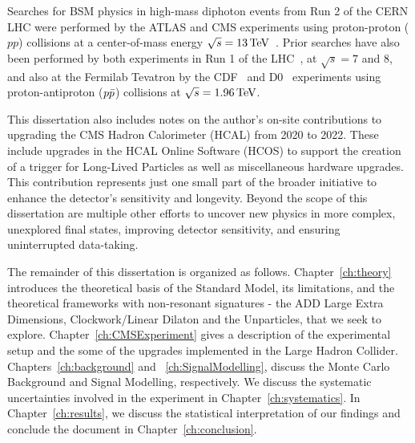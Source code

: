 Searches for BSM physics in high-mass diphoton events from Run 2 of the CERN LHC were performed by the ATLAS and CMS experiments using proton-proton ($pp$) collisions at a center-of-mass energy $\sqrt{s}=13\,\text{Te\hspace{-.08em}V}$~\cite{Sirunyan:2018wnk,Aad:2021,Aaboud:2017yyg,Khachatryan:2016yec,Aaboud:2016tru,Khachatryan:2016hje}. Prior searches have also been performed by both experiments in Run 1 of the LHC~\cite{Aad:2015mna,Khachatryan:2015qba,Aad:2012cy,Chatrchyan:2011fq,Chatrchyan:2011jx}, at $\sqrt{s}=7$ and 8\TeV, and also at the Fermilab Tevatron by the CDF~\cite{Aaltonen:2011xp,CDF:2002hrr,CDF:2010muc,CDF:2011weq} and D0~\cite{Abazov:2010xh,D0:2000cve,D0:2008hxb,D0:2005srl} experiments using proton-antiproton ($p\Bar{p}$) collisions at $\sqrt{s}=1.96\,\text{Te\hspace{-.08em}V}$.



 This dissertation also includes notes on the author's on-site contributions to upgrading the CMS Hadron Calorimeter (HCAL) from 2020 to 2022. These include upgrades in the HCAL Online Software (HCOS) to support the creation of a trigger for Long-Lived Particles as well as miscellaneous hardware upgrades. This contribution represents just one small part of the broader initiative to enhance the detector's sensitivity and longevity. Beyond the scope of this dissertation are multiple other efforts to uncover new physics in more complex, unexplored final states, improving detector sensitivity, and ensuring uninterrupted data-taking.

The remainder of this dissertation is organized as follows. Chapter~\ref{ch:theory} introduces the theoretical basis of the Standard Model, its limitations, and the theoretical frameworks with non-resonant signatures - the ADD Large Extra Dimensions, Clockwork/Linear Dilaton and the Unparticles, that we seek to explore. Chapter~\ref{ch:CMSExperiment} gives a description of the experimental setup and the some of the upgrades implemented in the Large Hadron Collider. Chapters~\ref{ch:background} and ~\ref{ch:SignalModelling}, discuss the Monte Carlo Background and Signal Modelling, respectively. We discuss the systematic uncertainties involved in the experiment in Chapter~\ref{ch:systematics}. In Chapter~\ref{ch:results}, we discuss the statistical interpretation of our findings and conclude the document in Chapter~\ref{ch:conclusion}.

